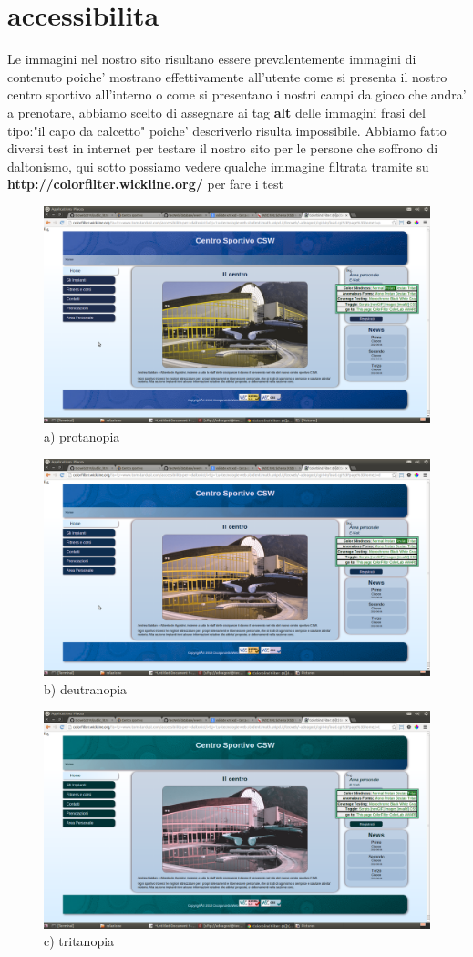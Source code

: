 \section{accessibilita}
Le immagini nel nostro sito risultano essere prevalentemente immagini di contenuto poiche' mostrano effettivamente all'utente come si presenta il nostro centro sportivo all'interno o come si presentano i nostri campi da gioco che andra' a prenotare, abbiamo scelto di assegnare ai tag \textbf{alt} delle immagini frasi del tipo:"il capo da calcetto" poiche' descriverlo risulta impossibile.
Abbiamo fatto diversi test in internet per testare il nostro sito per le persone che soffrono di daltonismo, qui sotto possiamo vedere qualche immagine filtrata tramite su \textbf{http://colorfilter.wickline.org/} per fare i test \newline
\begin{figure}
	\includegraphics[height=0.5\textwidth]{images/protan.png} 
	\caption{a) protanopia}
\end{figure}
\begin{figure}
	\includegraphics[height=0.5\textwidth]{images/deutran.png} 
	\caption{b) deutranopia} 
\end{figure}
\begin{figure}
	\includegraphics[height=0.5\textwidth]{images/tritan.png} 
	\caption{c) tritanopia}
\end{figure}
